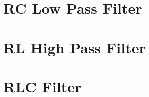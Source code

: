 \documentclass[a5paper,12pt]{article}
\begin{document}

\clearpage
\tableofcontents
\clearpage

\section{RC Low Pass Filter}

\clearpage

\section{RL High Pass Filter}

\clearpage

\section{RLC Filter}

\clearpage

\clearpage
{}
\printindex
\end{document}
